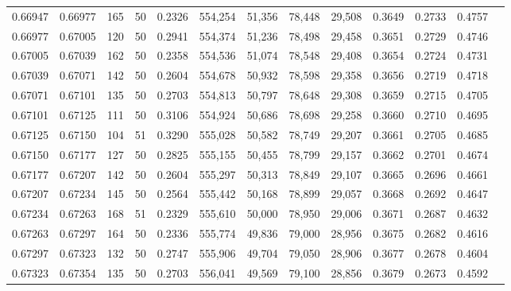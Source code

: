 \begin{tabular}{rrrrrrrrrrrrr}
0.66947 & 0.66977 &   165 &  50 &                                     0.2326 & 554,254 &  51,356 &  78,448 &  29,508 & 0.3649 & 0.2733 & 0.4757 \\
0.66977 & 0.67005 &   120 &  50 &                                     0.2941 & 554,374 &  51,236 &  78,498 &  29,458 & 0.3651 & 0.2729 & 0.4746 \\
0.67005 & 0.67039 &   162 &  50 &                                     0.2358 & 554,536 &  51,074 &  78,548 &  29,408 & 0.3654 & 0.2724 & 0.4731 \\
0.67039 & 0.67071 &   142 &  50 &                                     0.2604 & 554,678 &  50,932 &  78,598 &  29,358 & 0.3656 & 0.2719 & 0.4718 \\
0.67071 & 0.67101 &   135 &  50 &                                     0.2703 & 554,813 &  50,797 &  78,648 &  29,308 & 0.3659 & 0.2715 & 0.4705 \\
0.67101 & 0.67125 &   111 &  50 &                                     0.3106 & 554,924 &  50,686 &  78,698 &  29,258 & 0.3660 & 0.2710 & 0.4695 \\
0.67125 & 0.67150 &   104 &  51 &                                     0.3290 & 555,028 &  50,582 &  78,749 &  29,207 & 0.3661 & 0.2705 & 0.4685 \\
0.67150 & 0.67177 &   127 &  50 &                                     0.2825 & 555,155 &  50,455 &  78,799 &  29,157 & 0.3662 & 0.2701 & 0.4674 \\
0.67177 & 0.67207 &   142 &  50 &                                     0.2604 & 555,297 &  50,313 &  78,849 &  29,107 & 0.3665 & 0.2696 & 0.4661 \\
0.67207 & 0.67234 &   145 &  50 &                                     0.2564 & 555,442 &  50,168 &  78,899 &  29,057 & 0.3668 & 0.2692 & 0.4647 \\
0.67234 & 0.67263 &   168 &  51 &                                     0.2329 & 555,610 &  50,000 &  78,950 &  29,006 & 0.3671 & 0.2687 & 0.4632 \\
0.67263 & 0.67297 &   164 &  50 &                                     0.2336 & 555,774 &  49,836 &  79,000 &  28,956 & 0.3675 & 0.2682 & 0.4616 \\
0.67297 & 0.67323 &   132 &  50 &                                     0.2747 & 555,906 &  49,704 &  79,050 &  28,906 & 0.3677 & 0.2678 & 0.4604 \\
0.67323 & 0.67354 &   135 &  50 &                                     0.2703 & 556,041 &  49,569 &  79,100 &  28,856 & 0.3679 & 0.2673 & 0.4592 \\

\end{tabular}
